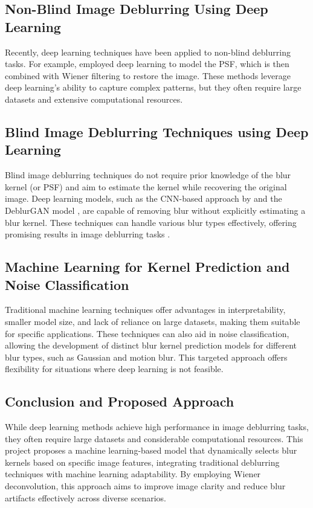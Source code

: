 \documentclass[twoside,11pt]{article}
\begin{document}
\subsection{Non-Blind Image Deblurring Using Deep Learning}
Recently, deep learning techniques have been applied to non-blind deblurring tasks. For example, \citet{dong2024dwdn} employed deep learning to model the PSF, which is then combined with Wiener filtering to restore the image. These methods leverage deep learning’s ability to capture complex patterns, but they often require large datasets and extensive computational resources.

\subsection{Blind Image Deblurring Techniques using Deep Learning}
Blind image deblurring techniques do not require prior knowledge of the blur kernel (or PSF) and aim to estimate the kernel while recovering the original image. Deep learning models, such as the CNN-based approach by \citet{nah2016multi} and the DeblurGAN model \citep{kupyn2018deblurgan}, are capable of removing blur without explicitly estimating a blur kernel. These techniques can handle various blur types effectively, offering promising results in image deblurring tasks \citep{amrollahi2023survey}.

\subsection{Machine Learning for Kernel Prediction and Noise Classification}
Traditional machine learning techniques offer advantages in interpretability, smaller model size, and lack of reliance on large datasets, making them suitable for specific applications. These techniques can also aid in noise classification, allowing the development of distinct blur kernel prediction models for different blur types, such as Gaussian and motion blur. This targeted approach offers flexibility for situations where deep learning is not feasible.

\subsection{Conclusion and Proposed Approach}
While deep learning methods achieve high performance in image deblurring tasks, they often require large datasets and considerable computational resources. This project proposes a machine learning-based model that dynamically selects blur kernels based on specific image features, integrating traditional deblurring techniques with machine learning adaptability. By employing Wiener deconvolution, this approach aims to improve image clarity and reduce blur artifacts effectively across diverse scenarios.


\end{document}
